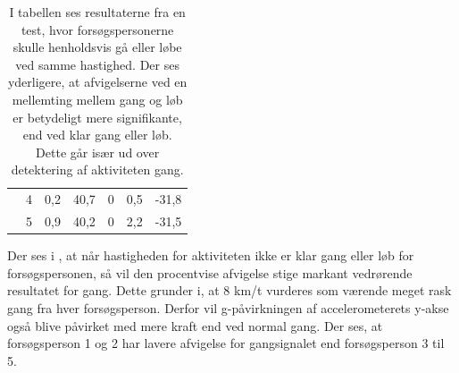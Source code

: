 \begin{table}[H]
{\begin{tabular}{ccccccc}
		& 4                                                                                                      & 0,2  & 40,7                                                                                            & 0     & 0,5   & -31,8                                                                                             \\
		& 5                                                                                                    & 0,9     & 40,2                                                                                           & 0         & 2,2 & -31,5  \\ \hline 
		\end{tabular}
	}
	\caption{I tabellen ses resultaterne fra en test, hvor forsøgspersonerne skulle henholdsvis gå eller løbe ved samme hastighed. Der ses yderligere, at afvigelserne ved en mellemting mellem gang og løb er betydeligt mere signifikante, end ved klar gang eller løb. Dette går især ud over detektering af aktiviteten gang.}
	\label{tab:samletsys_8kmt}
\end{table}\vspace{-.25cm}
Der ses i , at når hastigheden for aktiviteten ikke er klar gang eller løb for forsøgspersonen, så vil den procentvise afvigelse stige markant vedrørende resultatet for gang. Dette grunder i, at 8 km/t vurderes som værende meget rask gang fra hver forsøgsperson. Derfor vil g-påvirkningen af accelerometerets y-akse også blive påvirket med mere kraft end ved normal gang. Der ses, at forsøgsperson 1 og 2 har lavere afvigelse for gangsignalet end forsøgsperson 3 til 5.

